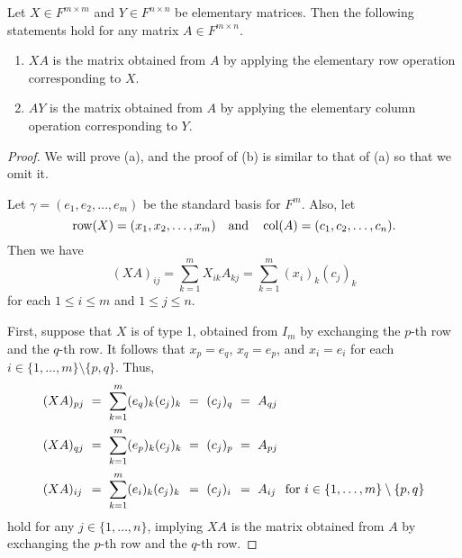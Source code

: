 \begin{proposition}
  Let $X \in F^{m \times m}$ and $Y \in F^{n \times n}$ be elementary matrices.
  Then the following statements hold for any matrix $A \in F^{m \times n}$.
  \begin{enumerate}
    \item $XA$ is the matrix obtained from $A$ by applying the elementary row
    operation corresponding to $X$.
    \item $AY$ is the matrix obtained from $A$ by applying the elementary
    column operation corresponding to $Y$.
  \end{enumerate}
\end{proposition}
\begin{proof}
  We will prove (a), and the proof of (b) is similar to that of (a) so that we
  omit it.

  Let $\gamma = (e_1, e_2, \dots, e_m)$ be the standard basis for
  $F^m$.
  Also, let
  \begin{equation*}
    \operatorname{row}(X) = (x_1, x_2, \dots, x_m)
    \quad \text{and} \quad
    \operatorname{col}(A) = (c_1, c_2, \dots, c_n).
  \end{equation*}
  Then we have
  \begin{equation*}
    (XA)_{ij}
    = \sum_{k=1}^m X_{ik}A_{kj}
    = \sum_{k=1}^m (x_i)_k (c_j)_k
  \end{equation*}
  for each $1 \leq i \leq m$ and $1 \leq j \leq n$.

  First, suppose that $X$ is of type 1, obtained from $I_m$ by exchanging the
  $p$-th row and the $q$-th row.
  It follows that $x_p = e_q$, $x_q = e_p$, and $x_i = e_i$ for each
  $i \in \{1, \dots, m\} \setminus \{p, q\}$.
  Thus,
  \begin{equation*}
    \setlength\arraycolsep{3pt}
    \begin{array}{ll>{\displaystyle}llllll}
      (XA)_{pj}&=&\sum_{k=1}^m (e_q)_k(c_j)_k&=&(c_j)_q&=&A_{qj}& \\[1.5em]
      (XA)_{qj}&=&\sum_{k=1}^m (e_p)_k(c_j)_k&=&(c_j)_p&=&A_{pj}& \\[1.5em]
      (XA)_{ij}&=&\sum_{k=1}^m (e_i)_k(c_j)_k&=&(c_j)_i&=&A_{ij}&
      \text{for $i \in \{1, \dots, m\} \setminus \{p, q\}$}
    \end{array}
  \end{equation*}
  hold for any $j \in \{1, \dots, n\}$, implying $XA$ is the matrix obtained
  from $A$ by exchanging the $p$-th row and the $q$-th row.


\end{proof}

